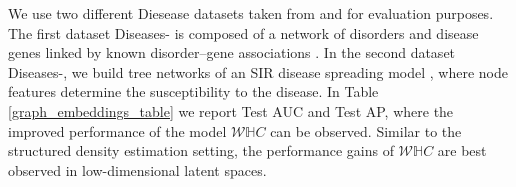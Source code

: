 We use two different Diesease datasets taken from \citep{chami2019hyperbolic} and \citep{mathieu2019continuous} for evaluation purposes. The first dataset Diseases- is composed of a network of disorders and disease genes linked by known disorder–gene associations \cite{goh2007human}. In the second dataset Diseases-, we build tree networks of an SIR disease spreading model \cite{anderson1992infectious}, where node features determine the susceptibility to the disease. In Table \ref{graph_embeddings_table} we report Test AUC and Test AP, where the improved performance of the model $\mathcal{W}\mathbb{H}C$ can be observed. Similar to the structured density estimation setting, the performance gains of $\mathcal{W}\mathbb{H}C$ are best observed in low-dimensional latent spaces.




    
    
    
